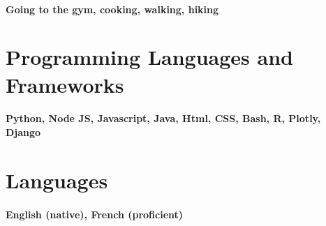 \documentclass{article}
\begin{document}
\paragraph{Going to the gym, cooking, walking, hiking}



\section{Programming Languages and Frameworks}

\paragraph{Python, Node JS, Javascript, Java, Html, CSS, Bash, R, Plotly, Django}

\section{Languages}

\paragraph{English (native), French (proficient)}
\end{document}
